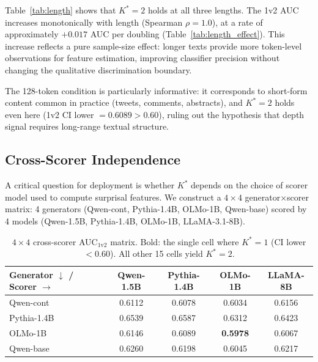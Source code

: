 \documentclass[11pt]{article}
\newcommand{\Kstar}{K^{*}}
\begin{document}
Table~\ref{tab:length} shows that $\Kstar\!=\!2$ holds at all three lengths.
The 1v2 AUC increases monotonically with length (Spearman $\rho\!=\!1.0$), at a rate of approximately $+0.017$ AUC per doubling (Table~\ref{tab:length_effect}).
This increase reflects a pure sample-size effect: longer texts provide more token-level observations for feature estimation, improving classifier precision without changing the qualitative discrimination boundary.

The 128-token condition is particularly informative: it corresponds to short-form content common in practice (tweets, comments, abstracts), and $\Kstar\!=\!2$ holds even here (1v2 CI lower $= 0.6089 > 0.60$), ruling out the hypothesis that depth signal requires long-range textual structure.

\subsection{Cross-Scorer Independence}
\label{sec:exp_scorer}

A critical question for deployment is whether $\Kstar$ depends on the choice of scorer model used to compute surprisal features.
We construct a $4\!\times\!4$ generator$\times$scorer matrix: 4 generators (Qwen-cont, Pythia-1.4B, OLMo-1B, Qwen-base) scored by 4 models (Qwen-1.5B, Pythia-1.4B, OLMo-1B, LLaMA-3.1-8B).

\begin{table}[t]
\centering
\caption{$4\!\times\!4$ cross-scorer AUC$_{1\text{v}2}$ matrix. Bold: the single cell where $\Kstar\!=\!1$ (CI lower $< 0.60$). All other 15 cells yield $\Kstar\!=\!2$.}
\label{tab:cross_scorer}
\small
\begin{tabular}{lcccc}
\toprule
\textbf{Generator $\downarrow$ / Scorer $\to$} & \textbf{Qwen-1.5B} & \textbf{Pythia-1.4B} & \textbf{OLMo-1B} & \textbf{LLaMA-8B} \\
\midrule
Qwen-cont   & 0.6112 & 0.6078 & 0.6034 & 0.6156 \\
Pythia-1.4B  & 0.6539 & 0.6587 & 0.6312 & 0.6423 \\
OLMo-1B     & 0.6146 & 0.6089 & \textbf{0.5978} & 0.6067 \\
Qwen-base   & 0.6260 & 0.6198 & 0.6045 & 0.6217 \\
\bottomrule
\end{tabular}
\end{table}
\end{document}
